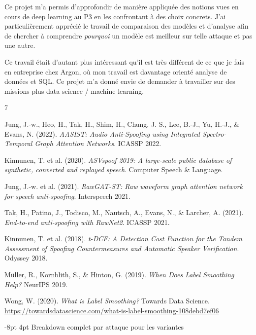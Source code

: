 \documentclass[10pt, a4paper]{article}
\makeatletter
\renewcommand{\section}{\@startsection{section}{1}{\z@}%
  {-8pt \@plus -2pt \@minus -2pt}{4pt \@plus 1pt}%
  {\normalfont\Large\bfseries}}
\makeatother
\begin{document}
Ce projet m'a permis d'approfondir de manière appliquée des notions vues en cours de deep learning au P3 en les confrontant à des choix concrets. J'ai particulièrement apprécié le travail de comparaison des modèles et d'analyse afin de chercher à comprendre \textit{pourquoi} un modèle est meilleur sur telle attaque et pas une autre.

Ce travail était d'autant plus intéressant qu'il est très différent de ce que je fais en entreprise chez Argon, où mon travail est davantage orienté analyse de données et SQL. Ce projet m'a donné envie de demander à travailler sur des missions plus data science / machine learning.

\begin{thebibliography}{7}

Jung, J.-w., Heo, H., Tak, H., Shim, H., Chung, J. S., Lee, B.-J., Yu, H.-J., \& Evans, N. (2022).
\textit{AASIST: Audio Anti-Spoofing using Integrated Spectro-Temporal Graph Attention Networks}.
ICASSP 2022.

Kinnunen, T. et al. (2020).
\textit{ASVspoof 2019: A large-scale public database of synthetic, converted and replayed speech}.
Computer Speech \& Language.

Jung, J.-w. et al. (2021).
\textit{RawGAT-ST: Raw waveform graph attention network for speech anti-spoofing}.
Interspeech 2021.

Tak, H., Patino, J., Todisco, M., Nautsch, A., Evans, N., \& Larcher, A. (2021).
\textit{End-to-end anti-spoofing with RawNet2}.
ICASSP 2021.

Kinnunen, T. et al. (2018).
\textit{t-DCF: A Detection Cost Function for the Tandem Assessment of Spoofing Countermeasures and Automatic Speaker Verification}.
Odyssey 2018.

Müller, R., Kornblith, S., \& Hinton, G. (2019).
\textit{When Does Label Smoothing Help?}
NeurIPS 2019.

Wong, W. (2020).
\textit{What is Label Smoothing?}
Towards Data Science.
\url{https://towardsdatascience.com/what-is-label-smoothing-108debd7ef06}

\end{thebibliography}

\clearpage
\appendix

\section{Breakdown complet par attaque pour les variantes}
\label{ann:breakdown}
\end{document}
